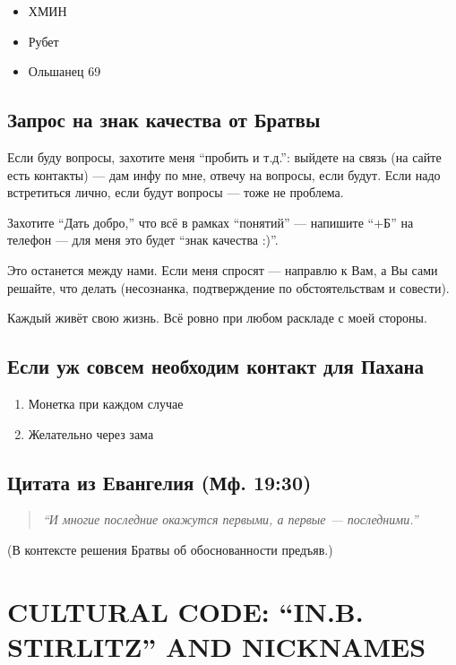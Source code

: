 \documentclass[11pt,a4paper]{article}
\theoremstyle{definition}
\theoremstyle{remark}
\begin{document}
{\begin{itemize}
\item ХМИН
\item Рубет
\item Ольшанец 69
\end{itemize}

\subsection{Запрос на знак качества от Братвы}

Если буду вопросы, захотите меня ``пробить и т.д.'': выйдете на связь (на сайте 
есть контакты) — дам инфу по мне, отвечу на вопросы, если будут. Если надо 
встретиться лично, если будут вопросы — тоже не проблема.

Захотите ``Дать добро,'' что всё в рамках ``понятий'' — напишите ``+Б'' на телефон — 
для меня это будет ``знак качества :)''.

Это останется между нами. Если меня спросят — направлю к Вам, а Вы сами решайте, 
что делать (несознанка, подтверждение по обстоятельствам и совести).

Каждый живёт свою жизнь. Всё ровно при любом раскладе с моей стороны.

\subsection{Если уж совсем необходим контакт для Пахана}

\begin{enumerate}
\item Монетка при каждом случае
\item Желательно через зама
\end{enumerate}

\subsection{Цитата из Евангелия (Мф. 19:30)}

\begin{quote}
\textit{``И многие последние окажутся первыми, а первые — последними.''}
\end{quote}

(В контексте решения Братвы об обоснованности предъяв.)

} %

\section{CULTURAL CODE: ``IN.B. STIRLITZ'' AND NICKNAMES}
\label{app:cultural-code}
\end{document}
